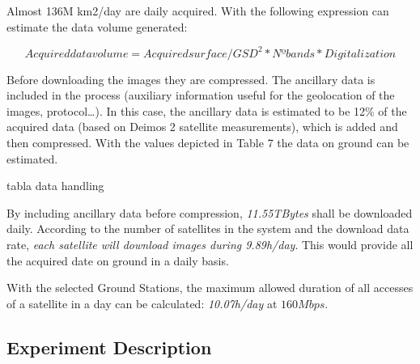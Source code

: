 Almost 136M km2/day are daily acquired. With the following expression can estimate the data volume generated:

\begin{equation}
Acquired data volume= Acquired surface/GSD^2 * Nº bands * Digitalization 
\end{equation}

Before downloading the images they are compressed. The ancillary data is included in the process (auxiliary information useful for the geolocation of the images, protocol\ldots). In this case, the ancillary data is estimated to be 12\% of the acquired data (based on Deimos 2 satellite measurements), which is added and then compressed. With the values depicted in Table 7 the data on ground can be estimated.

tabla data handling


By including ancillary data before compression, \emph{11.55TBytes} shall be downloaded daily. According to the number of satellites in the system and the download data rate, \emph{each satellite will download images during 9.89h/day}. This would provide all the acquired date on ground in a daily basis.

With the selected Ground Stations, the maximum allowed duration of all accesses
of a satellite in a day can be calculated: \emph{10.07h/day} at $160Mbps$. 



\subsection{Experiment Description}


